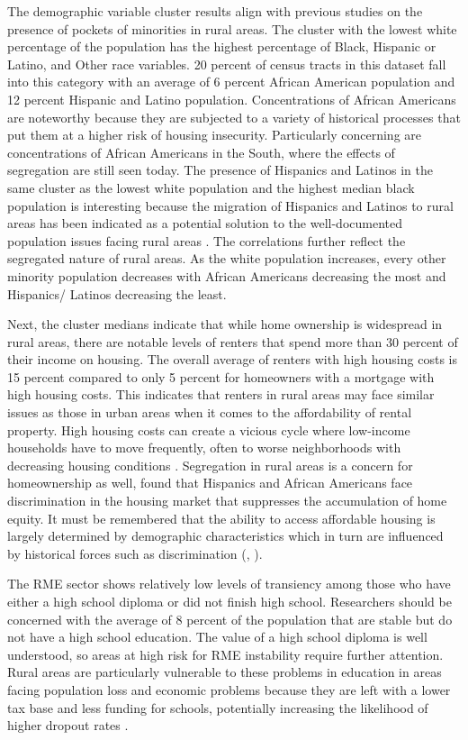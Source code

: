  The demographic variable cluster results align with previous studies on the presence of pockets of minorities in rural areas. The cluster with the lowest white percentage of the population has the highest percentage of Black, Hispanic or Latino, and Other race variables. 20 percent of census tracts in this dataset fall into this category with an average of 6 percent African American population and 12 percent Hispanic and Latino population. Concentrations of African Americans are noteworthy because they are subjected to a variety of historical processes that put them at a higher risk of housing insecurity. Particularly concerning are concentrations of African Americans in the South, where the effects of segregation are still seen today. The presence of Hispanics and Latinos in the same cluster as the lowest white population and the highest median black population is interesting because the migration of Hispanics and Latinos to rural areas has been indicated as a potential solution to the well-documented population issues facing rural areas \citep{lichter_demographic_2020}. The correlations further reflect the segregated nature of rural areas. As the white population increases, every other minority population decreases with African Americans decreasing the most and Hispanics/ Latinos decreasing the least. 
 
 Next, the cluster medians indicate that while home ownership is widespread in rural areas, there are notable levels of renters that spend more than 30 percent of their income on housing. The overall average of renters with high housing costs is 15 percent compared to only 5 percent for homeowners with a mortgage with high housing costs. This indicates that renters in rural areas may face similar issues as those in urban areas when it comes to the affordability of rental property. High housing costs can create a vicious cycle where low-income households have to move frequently, often to worse neighborhoods with decreasing housing conditions \citep{desmond_forced_2015}. Segregation in rural areas is a concern for homeownership as well, \citet{krivo_housing_2004} found that Hispanics and African Americans face discrimination in the housing market that suppresses the accumulation of home equity. It must be remembered that the ability to access affordable housing is largely determined by demographic characteristics which in turn are influenced by historical forces such as discrimination (\citealp{yadavalli_comprehensive_2020}, \citealp{hernandez_housing_2019}). 

 
 The RME sector shows relatively low levels of transiency among those who have either a high school diploma or did not finish high school. Researchers should be concerned with the average of 8 percent of the population that are stable but do not have a high school education. The value of a high school diploma is well understood, so areas at high risk for RME instability require further attention. Rural areas are particularly vulnerable to these problems in education in areas facing population loss and economic problems because they are left with a lower tax base and less funding for schools, potentially increasing the likelihood of higher dropout rates \citep{blank_poverty_2005}.
 
